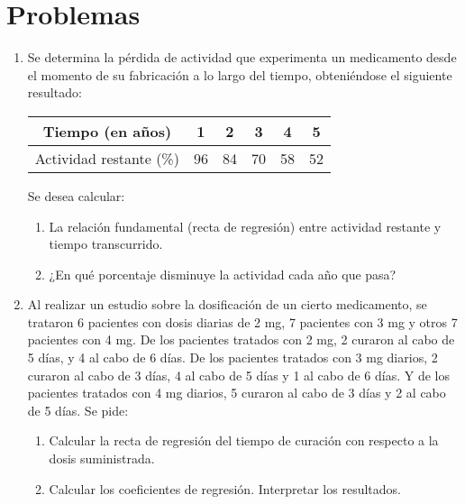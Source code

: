 \section{Problemas}
\begin{enumerate}[leftmargin=*]
\item  Se determina la pérdida de actividad que experimenta un
medicamento desde el momento de su fabricación a lo largo del tiempo, obteniéndose
el siguiente resultado:

\begin{center}
\begin{tabular}{|c|c|c|c|c|c|}
\hline Tiempo (en años) & 1 & 2 & 3 & 4 & 5 \\ \hline Actividad restante (\%) & 96 &
84 & 70 & 58 & 52 \\ \hline
\end{tabular}
\end{center}

Se desea calcular:

\begin{enumerate}
\item  La relación fundamental (recta de regresión) entre
actividad restante y tiempo transcurrido.

\item ¿En qué porcentaje disminuye la actividad cada año que pasa?
\end{enumerate}

\item Al realizar un estudio sobre la dosificación de un cierto
medicamento, se trataron 6 pacientes con dosis diarias de 2 mg, 7 pacientes con 3 mg
y otros 7 pacientes con 4 mg. De los pacientes tratados con 2 mg, 2 curaron al cabo
de 5 días, y 4 al cabo de 6 días. De los pacientes tratados con 3 mg diarios, 2
curaron al cabo de 3 días, 4 al cabo de 5 días y 1 al cabo de 6 días. Y de los
pacientes tratados con 4 mg diarios, 5 curaron al cabo de 3 días y 2 al cabo de 5
días. Se pide:

\begin{enumerate}
\item  Calcular la recta de regresión del tiempo de curación con respecto a la dosis
suministrada.

\item  Calcular los coeficientes de regresión. Interpretar los resultados.
\end{enumerate}

\end{enumerate}
